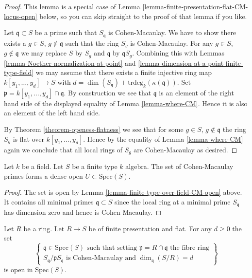 \begin{proof}
This lemma is a special case of
Lemma \ref{lemma-finite-presentation-flat-CM-locus-open} below,
so you can skip straight to the proof of that lemma if you like.

\medskip\noindent
Let $\mathfrak q \subset S$ be a prime such that $S_{\mathfrak q}$ is
Cohen-Macaulay. We have to show there exists a
$g \in S$, $g \not \in \mathfrak q$ such that the ring
$S_g$ is Cohen-Macaulay. For any $g \in S$, $g \not \in \mathfrak q$
we may replace $S$ by $S_g$ and $\mathfrak q$ by $\mathfrak qS_g$.
Combining this with
Lemmas \ref{lemma-Noether-normalization-at-point} and
\ref{lemma-dimension-at-a-point-finite-type-field}
we may assume that there exists a finite injective
ring map $k[y_1, \ldots, y_d] \to S$ with
$d = \dim(S_{\mathfrak q}) + \text{trdeg}_k(\kappa(\mathfrak q))$.
Set $\mathfrak p = k[y_1, \ldots, y_d] \cap \mathfrak q$.
By construction we see that $\mathfrak q$ is an element of
the right hand side of the displayed equality of
Lemma \ref{lemma-where-CM}. Hence it is also an element of
the left hand side.

\medskip\noindent
By Theorem \ref{theorem-openess-flatness} we see that for some $g \in S$,
$g \not \in \mathfrak q$ the ring $S_g$ is flat over $k[y_1, \ldots, y_d]$.
Hence by the equality of Lemma \ref{lemma-where-CM} again we conclude that
all local rings of $S_g$ are Cohen-Macaulay as desired.
\end{proof}

\begin{lemma}
\label{lemma-generic-CM}
Let $k$ be a field. Let $S$ be a finite type $k$ algebra.
The set of Cohen-Macaulay primes forms a dense open
$U \subset \text{Spec}(S)$.
\end{lemma}

\begin{proof}
The set is open by Lemma \ref{lemma-finite-type-over-field-CM-open} above.
It contains all minimal primes $\mathfrak q \subset S$
since the local ring at a minimal prime $S_{\mathfrak q}$
has dimension zero and hence is Cohen-Macaulay.
\end{proof}

\begin{lemma}
\label{lemma-finite-presentation-flat-CM-locus-open}
Let $R$ be a ring. Let $R \to S$ be of finite presentation
and flat. For any $d \geq 0$ the set
$$
\left\{
\begin{matrix}
\mathfrak q \in \text{Spec}(S)
\text{ such that setting }\mathfrak p = R \cap \mathfrak q
\text{ the fibre ring}\\
S_{\mathfrak q}/\mathfrak pS_{\mathfrak q}
\text{ is Cohen-Macaulay}
\text{ and } \dim_{\mathfrak q}(S/R) = d
\end{matrix}
\right\}
$$
is open in $\text{Spec}(S)$.
\end{lemma}

